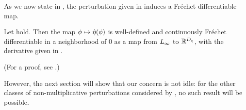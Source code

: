 As we now state in , the perturbation given in
 induces a Fr{\'e}chet differentiable map.

\begin{thm}
%
Let  hold. Then the map $\phi \mapsto
\hat\eta(\phi)$ is well-defined and continuously Fr{\'e}chet differentiable in a
neighborhood of $0$ as a map from ${L_{\infty}}$ to $\mathbb{R}^{D_{\eta}}$, with the
derivative given in .

(For a proof, see  .)

\end{thm}

However, the next section will show that our concern is not idle: for the other
classes of non-multiplicative perturbations considered by
\citet{gustafson:1996:local}, no such result will be possible.

